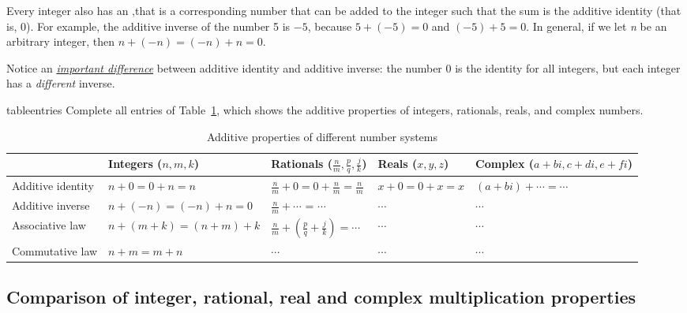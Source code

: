 Every integer also has an ,that is a corresponding number that can be added to the integer such
that the sum is the additive identity (that is, 0). For example, the
additive inverse of the number 5 is $-5$, because $5+(-5)=0$ and
$(-5)+5=0$. In general, if we let \emph{n }be an arbitrary integer,
then $n+(-n)=(-n)+n=0$.

Notice an \underline{\emph{important difference}}  between additive
identity and additive inverse: the number 0 is the identity for all
integers, but each integer has a \emph{different} inverse.

\begin{exercise}{tableentries}
Complete all entries of Table~\ref{additive_table}, which shows the additive properties of integers,
rationals, reals, and complex numbers.
\begin{table}[!htb]
\caption{Additive properties of different number systems}\label{additive_table}
\begin{tabular}{|p{1.8cm}|p{2.1cm}|p{2.3cm}|p{1.9cm}|p{2.8cm}|}
\hline 
\rule{0pt}{2.6ex} &Integers ($n,m,k$)  & Rationals ($\frac{n}{m},\frac{p}{q},\frac{j}{k}$)  & Reals ($x,y,z$)  & Complex  ($a+bi,c+di,e+fi$) \rule[-1.2ex]{0pt}{0pt} \tabularnewline
\hline
\hline 
\rule{0pt}{2.6ex} Additive  identity  &  $n+0 = 0+n  =n$   & $\frac{n}{m}+0 = 0+\frac{n}{m}=\frac{n}{m}$  & $x+0= 0+x=x$  &  $(a+bi)+\cdots= \cdots$ \rule[-1.2ex]{0pt}{0pt} \tabularnewline
\hline 
\rule{0pt}{2.6ex} Additive inverse  & $n+(-n)=(-n)+n=0$  & $\frac{n}{m} +  \cdots$ = $\cdots$  & $\cdots$  & $\cdots$ \rule[-1.2ex]{0pt}{0pt} \tabularnewline
\hline 
\rule{0pt}{2.6ex} Associative law\index{Associative property}  & $n+(m+k)=(n+m)+k$  & $\frac{n}{m}+(\frac{p}{q}+\frac{j}{k}) = \cdots$  & $\cdots$  & $\cdots$ \rule[-1.2ex]{0pt}{0pt} \tabularnewline
\hline 
\rule{0pt}{2.6ex} Commutative law\index{Commutative property}  & $n+m=m+n$  & $\cdots$  & $\cdots$ & $\cdots$\rule[-1.2ex]{0pt}{0pt} \tabularnewline
\hline
\end{tabular}
\end{table}

\end{exercise}

\subsection{Comparison of integer, rational, real and complex
multiplication properties}

